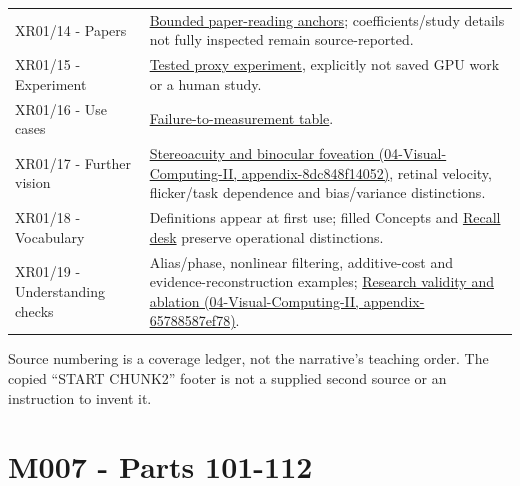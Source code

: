 {\begin{longtable}[]{@{}
  >{\raggedright\arraybackslash}p{}
  >{\raggedright\arraybackslash}p{}@{}}
XR01/14 - Papers & \href{Continuous\%20Notes/University\%20-\%20Worlds,\%20Images\%20and\%20Inference\%20-\%20Graphics,\%20Vision\%20and\%20Photography\#Read\%20research\%20as\%20a\%20chain\%20of\%20questions,\%20methods\%20and\%20bounded\%20conclusions/}{Bounded paper-reading anchors}; coefficients/study details not fully inspected remain source-reported. \\
XR01/15 - Experiment & \href{Continuous\%20Notes/University\%20-\%20Worlds,\%20Images\%20and\%20Inference\%20-\%20Graphics,\%20Vision\%20and\%20Photography\#Complete\%20numerical\%20and\%20image-space\%20laboratory/}{Tested proxy experiment}, explicitly not saved GPU work or a human study. \\
XR01/16 - Use cases & \href{Continuous\%20Notes/University\%20-\%20Worlds,\%20Images\%20and\%20Inference\%20-\%20Graphics,\%20Vision\%20and\%20Photography\#Diagnose\%20a\%20symptom\%20by\%20the\%20quantity\%20that\%20failed/}{Failure-to-measurement table}. \\
XR01/17 - Further vision & \href{../04-Visual-Computing-II/main.pdf\#nameddest=appendix-8dc848f14052}{Stereoacuity and binocular foveation (04-Visual-Computing-II, appendix-8dc848f14052)}, retinal velocity, flicker/task dependence and bias/variance distinctions. \\
XR01/18 - Vocabulary & Definitions appear at first use; filled Concepts and \href{Continuous\%20Notes/University\%20-\%20Worlds,\%20Images\%20and\%20Inference\%20-\%20Graphics,\%20Vision\%20and\%20Photography\#Teach\%20the\%20distinctions\%20from\%20a\%20blank\%20board/}{Recall desk} preserve operational distinctions. \\
XR01/19 - Understanding checks & Alias/phase, nonlinear filtering, additive-cost and evidence-reconstruction examples; \href{../04-Visual-Computing-II/main.pdf\#nameddest=appendix-65788587ef78}{Research validity and ablation (04-Visual-Computing-II, appendix-65788587ef78)}. \\
\end{longtable}
}

Source numbering is a coverage ledger, not the narrative's teaching order. The copied ``START CHUNK2'' footer is not a supplied second source or an instruction to invent it.

\section{M007 - Parts 101-112}\label{appendix-fd090d982a15-m007---parts-101-112}

